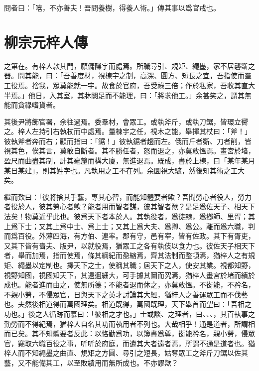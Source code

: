 問者曰：「嘻，不亦善夫！吾問養樹，得養人術。」傳其事以爲官戒也。

\theendnotes

\section[梓人傳\quad{\small 柳宗元}]{{\normalsize 柳宗元}\quad 梓人傳}
之第在。有梓人款其門，願傭隟宇而處焉。所職尋引、規矩、繩墨，家不居礱斲之器。問其能，曰：「吾善度材，視棟宇之制，高深、圓方、短長之宜，吾指使而羣工役焉。捨我，眾莫能就一宇。故食於官府，吾受祿三倍；作於私家，吾收其直大半焉。」他日，入其室，其牀闕足而不能理，曰：「將求他工。」余甚笑之，謂其無能而貪祿嗜貨者。

其後尹將飾官署，余往過焉。委羣材，會眾工。或執斧斤，或執刀鋸，皆環立嚮之。梓人左持引右執杖而中處焉。量棟宇之任，視木之能，舉揮其杖曰：「斧！」彼執斧者奔而右；顧而指曰：「鋸！」彼執鋸者趨而左。俄而斤者斲、刀者削，皆視其色，俟其言，莫敢自斷者。其不勝任者，怒而退之，亦莫敢慍焉。畫宮於堵，盈尺而曲盡其制，計其毫釐而構大廈，無進退焉。既成，書於上棟，曰「某年某月某日某建」，則其姓字也。凡執用之工不在列。余圜視大駭，然後知其術之工大矣。

繼而歎曰：「彼將捨其手藝，專其心智，而能知體要者歟？吾聞勞心者役人，勞力者役於人，彼其勞心者歟？能者用而智者謀，彼其智者歟？是足爲佐天子、相天下法矣！物莫近乎此也。彼爲天下者本於人。其執役者，爲徒隸，爲鄉師、里胥；其上爲下士；又其上爲中士、爲上士；又其上爲大夫、爲卿、爲公。離而爲六職，判而爲百役。外薄四海，有方伯、連率。郡有守，邑有宰，皆有佐政。其下有胥吏，又其下皆有嗇夫、版尹，以就役焉，猶眾工之各有執伎以食力也。彼佐天子相天下者，舉而加焉，指而使焉，條其綱紀而盈縮焉，齊其法制而整頓焉，猶梓人之有規矩、繩墨以定制也。擇天下之士，使稱其職；居天下之人，使安其業。視都知野，視野知國，視國知天下，其遠邇細大，可手據其圖而究焉，猶梓人畫宮於堵而績於成也。能者進而由之，使無所德；不能者退而休之，亦莫敢慍。不衒能，不矜名，不親小勞，不侵眾官，日與天下之英才討論其大經，猶梓人之善運眾工而不伐藝也。夫然後相道得而萬國理矣。相道既得，萬國既理，天下舉首而望曰：「吾相之功也。」後之人循跡而慕曰：「彼相之才也。」士或談、之理者，曰、、、，其百執事之勤勞而不得紀焉，猶梓人自名其功而執用者不列也。大哉相乎！通是道者，所謂相而已矣。其不知體要者反此：以恪勤爲功，以簿書爲尊，衒能矜名，親小勞，侵眾官，竊取六職百役之事，听听於府庭，而遺其大者遠者焉，所謂不通是道者也。猶梓人而不知繩墨之曲直、規矩之方圓、尋引之短長，姑奪眾工之斧斤刀鋸以佐其藝，又不能備其工，以至敗績用而無所成也。不亦謬歟？

